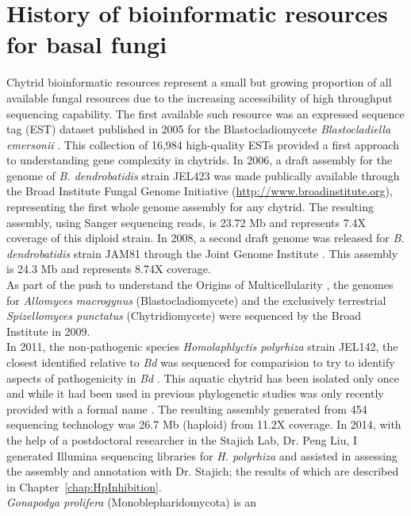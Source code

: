 \section{History of bioinformatic resources for basal fungi}
Chytrid bioinformatic resources represent a small but growing proportion of 
all available fungal resources due to the increasing accessibility of high throughput sequencing capability. The first available
such resource was an expressed sequence tag (EST) dataset
published in 2005 for the Blastocladiomycete \textit{Blastocladiella
  emersonii} \cite{Ribichich2005}. This collection of 16,984
high-quality ESTs provided a first approach to understanding gene
complexity in chytrids. In 2006, a draft assembly for the genome of
\textit{B. dendrobatidis} strain JEL423 was made publically available
through the Broad Institute Fungal Genome Initiative (\url{http://www.broadinstitute.org}), representing
the first whole genome assembly for any chytrid. The resulting assembly, using
Sanger sequencing reads, is 23.72 Mb and represents 7.4X coverage of this diploid strain. 
In 2008, a second draft genome
was released for \textit{B. dendrobatidis} strain JAM81 through the
Joint Genome Institute \cite{Bde2}. This
assembly is 24.3 Mb and represents 8.74X coverage. \\
\indent As part of the push to understand the Origins of
Multicellularity \cite{RuizTrillo2007}, the genomes for 
\textit{Allomyces macrogynus} (Blastocladiomycete) and 
the exclusively terrestrial \textit{Spizellomyces punctatus} 
(Chytridiomycete) were sequenced by the Broad Institute in 2009. \\
\indent In 2011, the non-pathogenic species \textit{Homolaphlyctis
  polyrhiza} strain JEL142, the closest identified relative to
\textit{Bd} was sequenced for comparision to try to identify aspects
of pathogenicity in \textit{Bd} \cite{Joneson2011}. This aquatic chytrid 
has been isolated only once and while it had been used in previous phylogenetic 
\cite{James2000,James2006sixGene,Letcher2008} studies was only recently provided with a formal name \cite{Longcore2011}. 
The resulting assembly generated from 454 sequencing technology was 26.7 Mb
(haploid) from 11.2X coverage. In 2014, with the help of a postdoctoral researcher in the
Stajich Lab, Dr. Peng Liu, I generated Illumina sequencing libraries
for \textit{H. polyrhiza} and assisted in assessing the assembly and
annotation with Dr. Stajich; the results of which are described in
Chapter~\ref{chap:HpInhibition}.\\
\indent \textit{Gonapodya prolifera} (Monoblepharidomycota) is an
